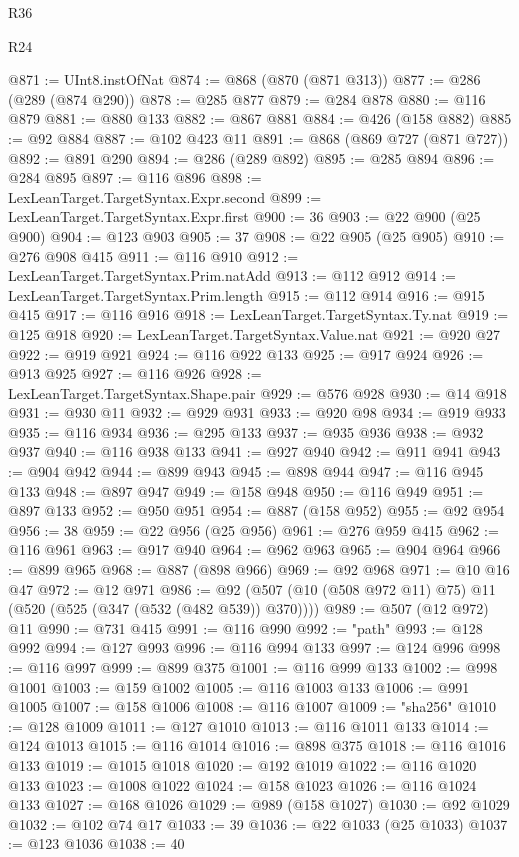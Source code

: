 \begin{lexlean}{R36}
\begin{lexlean}{R24}
\begin{coremodule}
{{{{{{{{{{{{{{{{{{{{{{{{{{{{{{{{{{{{{{{{{{{{{{{{{{{{{{{{{{{{{{{{{{{{{{{{{{{{{{{{{{{{{{{{{{{{{{{{{{{{{{{{{{{{{{{{{{{{{{{{{{{{{{{{{{{{{{{{{{{{{{{{{{{{{{{{{{{{{{{{{{{{{{{{{{{{{{{{{{{{{{{{{{{{{{{{{{{@871 := UInt8.instOfNat
@874 := @868 (@870 (@871 @313))
@877 := @286 (@289 (@874 @290))
@878 := @285 @877
@879 := @284 @878
@880 := @116 @879
@881 := @880 @133
@882 := @867 @881
@884 := @426 (@158 @882)
@885 := @92 @884
@887 := @102 @423 @11
@891 := @868 (@869 @727 (@871 @727))
@892 := @891 @290
@894 := @286 (@289 @892)
@895 := @285 @894
@896 := @284 @895
@897 := @116 @896
@898 := LexLeanTarget.TargetSyntax.Expr.second
@899 := LexLeanTarget.TargetSyntax.Expr.first
@900 := 36
@903 := @22 @900 (@25 @900)
@904 := @123 @903
@905 := 37
@908 := @22 @905 (@25 @905)
@910 := @276 @908 @415
@911 := @116 @910
@912 := LexLeanTarget.TargetSyntax.Prim.natAdd
@913 := @112 @912
@914 := LexLeanTarget.TargetSyntax.Prim.length
@915 := @112 @914
@916 := @915 @415
@917 := @116 @916
@918 := LexLeanTarget.TargetSyntax.Ty.nat
@919 := @125 @918
@920 := LexLeanTarget.TargetSyntax.Value.nat
@921 := @920 @27
@922 := @919 @921
@924 := @116 @922 @133
@925 := @917 @924
@926 := @913 @925
@927 := @116 @926
@928 := LexLeanTarget.TargetSyntax.Shape.pair
@929 := @576 @928
@930 := @14 @918
@931 := @930 @11
@932 := @929 @931
@933 := @920 @98
@934 := @919 @933
@935 := @116 @934
@936 := @295 @133
@937 := @935 @936
@938 := @932 @937
@940 := @116 @938 @133
@941 := @927 @940
@942 := @911 @941
@943 := @904 @942
@944 := @899 @943
@945 := @898 @944
@947 := @116 @945 @133
@948 := @897 @947
@949 := @158 @948
@950 := @116 @949
@951 := @897 @133
@952 := @950 @951
@954 := @887 (@158 @952)
@955 := @92 @954
@956 := 38
@959 := @22 @956 (@25 @956)
@961 := @276 @959 @415
@962 := @116 @961
@963 := @917 @940
@964 := @962 @963
@965 := @904 @964
@966 := @899 @965
@968 := @887 (@898 @966)
@969 := @92 @968
@971 := @10 @16 @47
@972 := @12 @971
@986 := @92 (@507 (@10 (@508 @972 @11) @75) @11 (@520 (@525 (@347 (@532 (@482 @539)) @370))))
@989 := @507 (@12 @972) @11
@990 := @731 @415
@991 := @116 @990
@992 := "path"
@993 := @128 @992
@994 := @127 @993
@996 := @116 @994 @133
@997 := @124 @996
@998 := @116 @997
@999 := @899 @375
@1001 := @116 @999 @133
@1002 := @998 @1001
@1003 := @159 @1002
@1005 := @116 @1003 @133
@1006 := @991 @1005
@1007 := @158 @1006
@1008 := @116 @1007
@1009 := "sha256"
@1010 := @128 @1009
@1011 := @127 @1010
@1013 := @116 @1011 @133
@1014 := @124 @1013
@1015 := @116 @1014
@1016 := @898 @375
@1018 := @116 @1016 @133
@1019 := @1015 @1018
@1020 := @192 @1019
@1022 := @116 @1020 @133
@1023 := @1008 @1022
@1024 := @158 @1023
@1026 := @116 @1024 @133
@1027 := @168 @1026
@1029 := @989 (@158 @1027)
@1030 := @92 @1029
@1032 := @102 @74 @17
@1033 := 39
@1036 := @22 @1033 (@25 @1033)
@1037 := @123 @1036
@1038 := 40
}}}}}}}}}}}}}}}}}}}}}}}}}}}}}}}}}}}}}}}}}}}}}}}}}}}}}}}}}}}}}}}}}}}}}}}}}}}}}}}}}}}}}}}}}}}}}}}}}}}}}}}}}}}}}}}}}}}}}}}}}}}}}}}}}}}}}}}}}}}}}}}}}}}}}}}}}}}}}}}}}}}}}}}}}}}}}}}}}}}}}}}}}}}}}}}}}}}
\end{coremodule}
\end{lexlean}
\end{lexlean}
